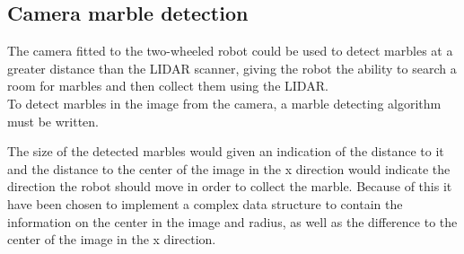 \documentclass[../Head/Main.tex]{subfiles}
\begin{document}
\subsection{Camera marble detection}
The camera fitted to the two-wheeled robot could be used to detect marbles at a greater distance than the LIDAR scanner, giving the robot the ability to search a room for marbles and then collect them using the LIDAR.\\
To detect marbles in the image from the camera, a marble detecting algorithm must be written.\par 

The size of the detected marbles would given an indication of the distance to it and the distance to the center of the image in the x direction would indicate the direction the robot should move in order to collect the marble. Because of this it have been chosen to implement a complex data structure to contain the information on the center in the image and radius, as well as the difference to the center of the image in the x direction.\par 
\end{document}
